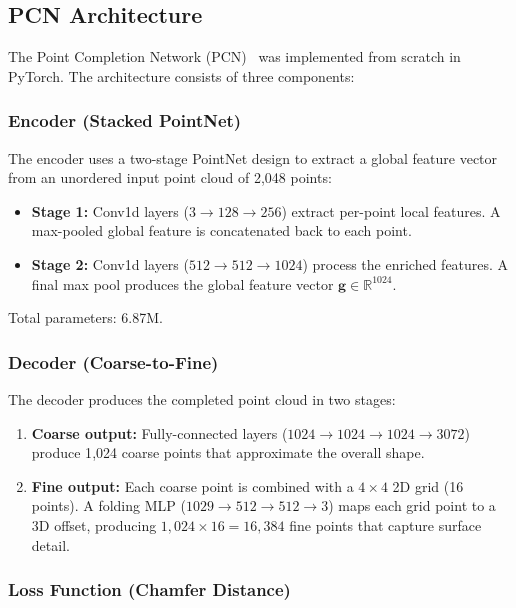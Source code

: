 \documentclass[a4paper, 12pt]{article}
\begin{document}
\subsection{PCN Architecture}

The Point Completion Network (PCN)~\cite{yuan2018pcn} was implemented from scratch in PyTorch. The architecture consists of three components:

\subsubsection{Encoder (Stacked PointNet)}

The encoder uses a two-stage PointNet design to extract a global feature vector from an unordered input point cloud of 2{,}048 points:
\begin{itemize}[nosep]
    \item \textbf{Stage 1:} Conv1d layers ($3 \to 128 \to 256$) extract per-point local features. A max-pooled global feature is concatenated back to each point.
    \item \textbf{Stage 2:} Conv1d layers ($512 \to 512 \to 1024$) process the enriched features. A final max pool produces the global feature vector $\mathbf{g} \in \mathbb{R}^{1024}$.
\end{itemize}
Total parameters: 6.87M.

\subsubsection{Decoder (Coarse-to-Fine)}

The decoder produces the completed point cloud in two stages:
\begin{enumerate}[nosep]
    \item \textbf{Coarse output:} Fully-connected layers ($1024 \to 1024 \to 1024 \to 3072$) produce 1{,}024 coarse points that approximate the overall shape.
    \item \textbf{Fine output:} Each coarse point is combined with a $4 \times 4$ 2D grid (16 points). A folding MLP ($1029 \to 512 \to 512 \to 3$) maps each grid point to a 3D offset, producing $1{,}024 \times 16 = 16{,}384$ fine points that capture surface detail.
\end{enumerate}

\subsubsection{Loss Function (Chamfer Distance)}
\end{document}
